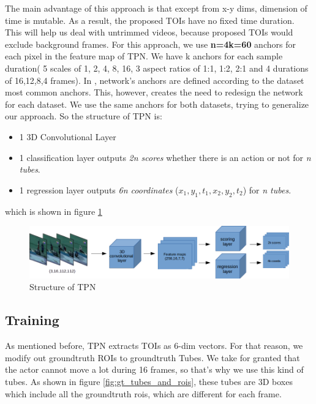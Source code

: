 \documentclass{report}
\begin{document}
The main advantage of this approach is that except from x-y dims, dimension of time is mutable. As a result, the proposed TOIs have
no fixed time duration. This will help us deal with untrimmed videos, because proposed TOIs would exclude background frames.
For this approach, we use \textbf{n=4k=60} anchors for each pixel in the feature map of TPN. We have k anchors for each sample
duration( 5 scales of 1, 2, 4, 8, 16, 3 aspect ratios of 1:1, 1:2, 2:1 and 4 durations of 16,12,8,4 frames).
In \cite{'DBLP:journals/corr/HouCS1},  network's anchors are defined according to the dataset most common anchors. This, however,
creates the need to redesign the network for each dataset. We use the same anchors for both datasets, trying to generalize our
approach.
So the structure of TPN is:
\begin{itemize}
\item 1 3D Convolutional Layer
\item 1 classification layer outputs \textit{2n scores} whether there is an action or not for \textit{n tubes}.
\item 1 regression layer outputs \textit{6n coordinates} ($x_1,y_1,t_1,x_2,y_2,t_2$) for \textit{n tubes}.
\end{itemize}

which is shown in figure \ref{fig:tpn_1_1}
\begin{figure}[h]

  \includegraphics[width=1.\textwidth]{tpn_1_1}
  \caption{Structure of TPN}
  \label{fig:tpn_1_1}
\end{figure}

\subsection{Training}
As mentioned before, TPN extracts TOIs as 6-dim vectors. For that reason, we modify out groundtruth ROIs to groundtruth Tubes.
We take for granted that the actor cannot move a lot during 16 frames, so that's why we use this kind of tubes. As shown 
in figure \ref{fig:gt_tubes_and_rois}, these tubes are 3D boxes which include all the groundtruth rois, which are different
for each frame.
\end{document}
